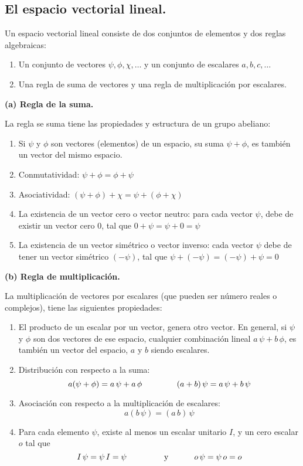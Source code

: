 \subsection{El espacio vectorial lineal.}
Un espacio vectorial lineal consiste de dos conjuntos de elementos y dos reglas algebraicas:
\begin{enumerate}
\item Un conjunto de vectores $\psi, \phi, \chi, \ldots$ y un conjunto de escalares $a, b, c, \ldots$
\item Una regla de suma de vectores y una regla de multiplicación por escalares.
\end{enumerate}
\textbf{(a) Regla de la suma.}

La regla se suma tiene las propiedades y estructura de un grupo abeliano:
\begin{enumerate}
\item Si $\psi$ y $\phi$ son vectores (elementos) de un espacio, su suma $\psi + \phi$, es también un vector del mismo espacio.
\item Conmutatividad: $\psi + \phi = \phi + \psi$
\item Asociatividad: $(\psi + \phi) + \chi = \psi + (\phi + \chi)$
\item La existencia de un vector cero o vector neutro: para cada vector $\psi$, debe de existir un vector cero $0$, tal que $0 + \psi = \psi + 0 = \psi$
\item La existencia de un vector simétrico o vector inverso: cada vector $\psi$ debe de tener un vector simétrico $(-\psi)$, tal que $\psi + (-\psi) = (-\psi) + \psi = 0$
\end{enumerate}
\textbf{(b) Regla de multiplicación.}

La multiplicación de vectores por escalares (que pueden ser número reales o complejos), tiene las siguientes propiedades:
\begin{enumerate}
\item El producto de un escalar por un vector, genera otro vector. En general, si $\psi$ y $\phi$ son dos vectores de ese espacio, cualquier combinación lineal $a \, \psi + b \, \phi$, es también un vector del espacio, $a$ y $b$ siendo escalares.
\item Distribución con respecto a la suma:
\begin{equation}
a (\psi + \phi) = a \, \psi + a \, \phi \hspace{1.5cm} (a + b) \, \psi = a \, \psi + b \, \psi
\label{eq:ecuacion_02_01}
\end{equation}
\item Asociación con respecto a la multiplicación de escalares:
\begin{equation}
a (b \, \psi) = (a \, b) \, \psi
\label{eq:ecuacion_02_02}
\end{equation}
\item Para cada elemento $\psi$, existe al menos un escalar unitario $I$, y un cero escalar $o$ tal que
\begin{equation}
I \, \psi = \psi \, I = \psi \hspace{1.5cm} \mbox{ y } \hspace{1cm} o \, \psi = \psi \, o = o
\label{eq:ecuacion_02_03}
\end{equation}
\end{enumerate}
